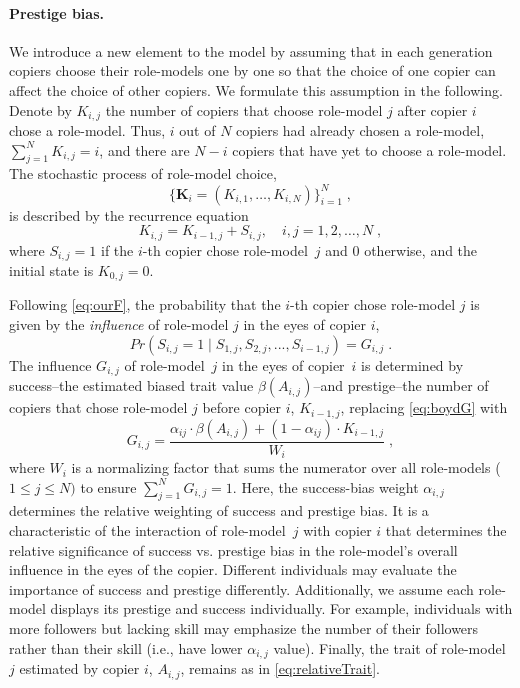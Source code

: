 \documentclass[12pt]{extarticle}
\let\vec\mathbf
\begin{document}
\paragraph{Prestige bias.}
We introduce a new element to the model by assuming that in each generation copiers choose their role-models one by one so that the choice of one copier can affect the choice of other copiers.
We formulate this assumption in the following.
Denote by $K_{i,j}$  the number of copiers that choose role-model $j$ after copier $i$ chose a role-model. Thus, $i$ out of $N$ copiers had already chosen a role-model, $\sum_{j=1}^N{K_{i,j}} = i$, and there are $N-i$ copiers that have yet to choose a role-model.
The stochastic process of role-model choice, 
\begin{equation} \label{eq:process}
\big\{\vec{K}_i = (K_{i,1}, \ldots, K_{i,N}) \big\}_{i=1}^N \;,
\end{equation}
is described by the recurrence equation
\begin{equation} \label{eq:recurrence}
K_{i,j} = K_{i-1,j} + S_{i,j}, \quad i,j=1,2,\ldots,N \;,
\end{equation}
where $S_{i,j}=1$ if the $i$-th copier chose role-model~$j$ and 0 otherwise, and the initial state is $K_{0,j}=0$.

Following \cref{eq:ourF}, the probability that the $i$-th copier chose role-model $j$ is given by the \emph{influence} of role-model $j$ in the eyes of copier $i$,
\begin{equation}\label{eq:recPrestige}
Pr(S_{i,j}=1 \mid S_{1,j},S_{2,j},...,S_{i-1,j}) = G_{i,j} \;.
\end{equation}
The influence $G_{i,j}$ of role-model~$j$ in the eyes of copier~$i$ is determined by success--the estimated biased trait value $\beta(A_{i,j})$--and prestige--the number of copiers that chose role-model $j$ before copier $i$, $K_{i-1,j}$, replacing \cref{eq:boydG} with
\begin{equation}\label{eq:prestige}
G_{i,j} = \frac{\alpha_{ij} \cdot \beta(A_{i,j}) + (1-\alpha_{ij}) \cdot K_{i-1,j}}{W_i} \;,
\end{equation}
where $W_i$ is a normalizing factor that sums the numerator over all role-models ($1\le j \le N)$ to ensure $\sum_{j=1}^{N}{G_{i,j}}=1$.
Here, the success-bias weight $\alpha_{i,j}$ determines the relative weighting of success and prestige bias. It is a characteristic of the interaction of role-model~$j$ with copier $i$ that determines the relative significance of  success vs. prestige bias in the role-model's overall influence in the eyes of the copier.
Different individuals may evaluate the importance of success and prestige differently. Additionally, we assume each role-model displays its prestige and success individually. For example, individuals with more followers but lacking skill may emphasize the number of their followers rather than their skill (i.e., have lower $\alpha_{i,j}$ value).
Finally, the trait of role-model $j$ estimated by copier $i$, $A_{i,j}$, remains as in \cref{eq:relativeTrait}.
\end{document}
